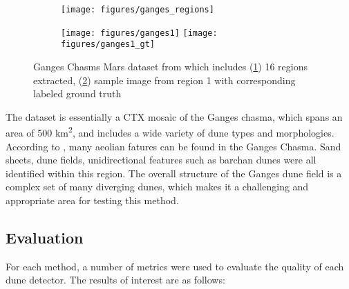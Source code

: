 \begin{figure}
	\centering
	\begin{subfigure}{\textwidth}
		\centering
		\texttt{[image: figures/ganges\_regions]}
		\caption{}
		\label{fig:ganges_regions}
	\end{subfigure}
	\begin{subfigure}{\textwidth}
		\centering
		\texttt{[image: figures/ganges1]}
		\texttt{[image: figures/ganges1\_gt]}
		\caption{}
		\label{fig:ganges1_image}
	\end{subfigure}
	\caption{Ganges Chasms Mars dataset from \cite{vaz_object_based_dune_analysis} which includes (\ref{fig:ganges_regions}) 16 regions extracted, (\ref{fig:ganges1_image}) sample image from region 1 with corresponding labeled ground truth}
	\label{fig:mars_ganges_dataset}
\end{figure}


The dataset is essentially a CTX mosaic of the Ganges chasma, which spans an area of 500 km\textsuperscript{2}, and includes a wide variety of dune types and morphologies. According to \cite{fenton_aeolian_sediment_ganges_chasma_mars}, many aeolian fatures can be found in the Ganges Chasma. Sand sheets, dune fields, unidirectional features such as barchan dunes were all identified within this region. The overall structure of the Ganges dune field is a complex set of many diverging dunes, which makes it a challenging and appropriate area for testing this method. 


\subsection{Evaluation}\label{subsec:evaluation}

For each method, a number of metrics were used to evaluate the quality of each dune detector. The results of interest are as follows:

